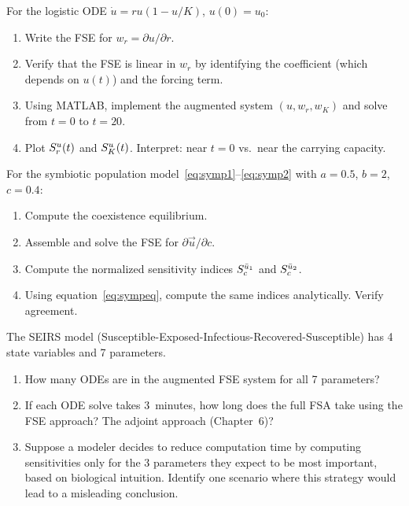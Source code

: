 \begin{exercise}[\bloom{L3}]
\label{ex:ch4:logistic}
For the logistic ODE $\dot{u} = ru(1-u/K)$, $u(0) = u_0$:
\begin{enumerate}[label=(\alph*)]
  \item Write the FSE for $w_r = \partial u/\partial r$.
  \item Verify that the FSE is linear in $w_r$ by identifying
        the coefficient (which depends on $u(t)$) and the forcing term.
  \item Using MATLAB, implement the augmented system
        $(u, w_r, w_K)$ and solve from $t = 0$ to $t = 20$.
  \item Plot $S_{r}^{u}(t)$ and $S_{K}^{u}(t)$.
        Interpret: near $t = 0$ vs.\ near the carrying capacity.
\end{enumerate}
\end{exercise}

\begin{exercise}[\bloom{L3}]
\label{ex:ch4:symbiotic}
For the symbiotic population model~\eqref{eq:symp1}--\eqref{eq:symp2}
with $a = 0.5$, $b = 2$, $c = 0.4$:
\begin{enumerate}[label=(\alph*)]
  \item Compute the coexistence equilibrium.
  \item Assemble and solve the FSE for $\partial\vec{u}/\partial c$.
  \item Compute the normalized sensitivity indices
        $S_{c}^{\bar{u}_1}$ and $S_{c}^{\bar{u}_2}$.
  \item Using equation~\eqref{eq:sympeq}, compute the same indices
        analytically. Verify agreement.
\end{enumerate}
\end{exercise}

\begin{exercise}[\bloom{L4}]
\label{ex:ch4:proliferation}
The SEIRS model (Susceptible-Exposed-Infectious-Recovered-Susceptible)
has 4 state variables and 7 parameters.
\begin{enumerate}[label=(\alph*)]
  \item How many ODEs are in the augmented FSE system for all 7 parameters?
  \item If each ODE solve takes 3~minutes, how long does the full FSA take
        using the FSE approach? The adjoint approach (Chapter~6)?
  \item Suppose a modeler decides to reduce computation time by computing
        sensitivities only for the 3 parameters they expect to be most
        important, based on biological intuition. Identify one scenario
        where this strategy would lead to a misleading conclusion.
\end{enumerate}
\end{exercise}

